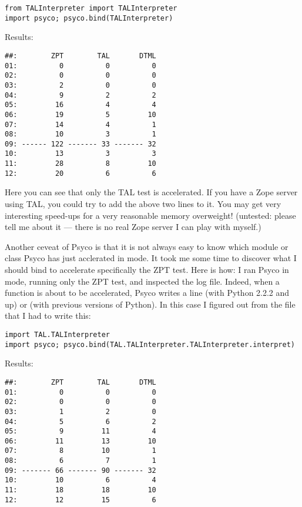 \documentclass{manual}
\begin{document}
\begin{verbatim}
from TALInterpreter import TALInterpreter
import psyco; psyco.bind(TALInterpreter)
\end{verbatim}

Results:

\begin{verbatim}
##:        ZPT        TAL       DTML
01:          0          0          0
02:          0          0          0
03:          2          0          0
04:          9          2          2
05:         16          4          4
06:         19          5         10
07:         14          4          1
08:         10          3          1
09: ------ 122 ------- 33 ------- 32
10:         13          3          3
11:         28          8         10
12:         20          6          6
\end{verbatim}

Here you can see that only the TAL test is accelerated.  If you have a Zope server using TAL, you could try to add the above two lines to it.  You may get very interesting speed-ups for a very reasonable memory overweight!  (untested: please tell me about it --- there is no real Zope server I can play with myself.)

Another ceveat of Psyco is that it is not always easy to know which module or class Psyco has just acclerated in  mode.  It took me some time to discover what I should bind to accelerate specifically the ZPT test.  Here is how: I ran Psyco in  mode, running only the ZPT test, and inspected the log file.  Indeed, when a function is about to be accelerated, Psyco writes a line  (with Python 2.2.2 and up) or  (with previous versions of Python).  In this case I figured out from the  file that I had to write this:

\begin{verbatim}
import TAL.TALInterpreter
import psyco; psyco.bind(TAL.TALInterpreter.TALInterpreter.interpret)
\end{verbatim}

Results:

\begin{verbatim}
##:        ZPT        TAL       DTML
01:          0          0          0
02:          0          0          0
03:          1          2          0
04:          5          6          2
05:          9         11          4
06:         11         13         10
07:          8         10          1
08:          6          7          1
09: ------- 66 ------- 90 ------- 32
10:         10          6          4
11:         18         18         10
12:         12         15          6
\end{verbatim}
\end{document}
